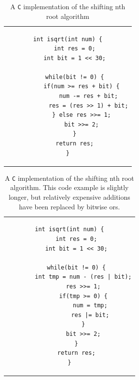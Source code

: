 			\begin{table}
				\centering
				\caption{A \texttt{C} implementation of the shifting nth root 
					algorithm}
				\label{sqrtc}
				\begin{tabular}{c}
				\begin{lstlisting}
int isqrt(int num) {
    int res = 0;
    int bit = 1 << 30;

    while(bit != 0) {
        if(num >= res + bit) {
            num -= res + bit;
            res = (res >> 1) + bit;
        } else res >>= 1;
        bit >>= 2;
    }
    return res;
}
				\end{lstlisting}
				\end{tabular}
			\end{table}

			\begin{table}
				\centering
				\caption{A \texttt{C} implementation of the shifting nth root
					algorithm. This code example is slightly longer, but
					relatively expensive additions have been replaced by
					bitwise ors.}
				\label{sqrtcopt}
				\begin{tabular}{c}
				\begin{lstlisting}
int isqrt(int num) {
    int res = 0;
    int bit = 1 << 30;

    while(bit != 0) {
        int tmp = num - (res | bit);
        res >>= 1;
        if(tmp >= 0) {
            num = tmp;
            res |= bit;
        }
        bit >>= 2;
    }
    return res;
}
				\end{lstlisting}
				\end{tabular}
			\end{table}

